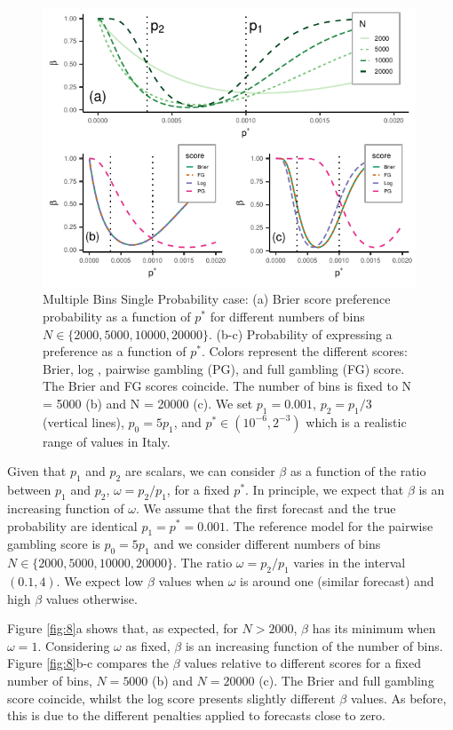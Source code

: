 \documentclass[referee,sn-basic]{sn-jnl}
\theoremstyle{thmstyleone}%
\theoremstyle{thmstyletwo}%
\theoremstyle{thmstylethree}%
\begin{document}
\begin{figure}
  \includegraphics[width = 0.99\textwidth]{figure7.pdf}
\caption{Multiple Bins Single Probability case: (a) Brier score preference probability as a function of $p^*$ for different numbers of bins $N \in \{2000,5000,10000,20000\}$. (b-c) Probability of expressing a preference as a function of $p^*$. Colors represent the different scores: Brier, log , pairwise gambling (PG), and full gambling (FG) score. The Brier and FG scores coincide. The number of bins is fixed to N = 5000 (b) and N = 20000 (c).  We set $p_1 = 0.001$, $p_2 = p_1/3$ (vertical lines), $p_0 = 5p_1$, and $p^* \in (10^{-6}, 2^{-3})$ which is a realistic range of values in Italy.}
\label{fig:7}
\end{figure}

Given that $p_1$ and $p_2$ are scalars, we can consider $\beta$ as a function of the ratio between $p_1$ and $p_2$,  $\omega = p_2/p_1$, for a fixed $p^*$. In principle, we expect that $\beta$ is an increasing function of $\omega$. We assume that the first forecast and the true probability are identical $p_1 = p^* = 0.001$. The reference model for the pairwise gambling score is $p_0 = 5p_1$ and we consider different numbers of bins $N \in \{2000, 5000, 10000, 20000\}$. The ratio $\omega = p_2/p_1$ varies in the interval $(0.1, 4)$. We expect low $\beta$ values when $\omega$ is around one (similar forecast) and high $\beta$ values otherwise.

Figure \ref{fig:8}a shows that, as expected, for $N > 2000$, $\beta$ has its minimum when $\omega = 1$. Considering $\omega$ as fixed, $\beta$ is an increasing function of the number of bins. Figure \ref{fig:8}b-c compares the $\beta$ values relative to different scores for a fixed number of bins, $N = 5000$ (b) and $N = 20000$ (c). The Brier and full gambling score coincide, whilst the log score presents slightly different $\beta$ values. As before, this is due to the different penalties applied to forecasts close to zero. 
\end{document}

